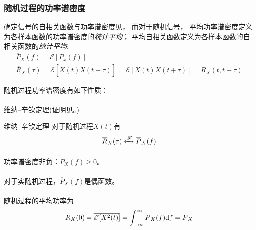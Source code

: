     \subsubsection{随机过程的功率谱密度}
    确定信号的自相关函数与功率谱密度见，
    而对于随机信号，
    平均功率谱密度定义为各样本函数的功率谱密度的\emph{统计平均}；
    平均自相关函数定义为各样本函数的自相关函数的\emph{统计平均}:
    \begin{align}
        \overline{P}_X(f)=\mathscr{E}[P_x(f)]\hspace{10em}\label{eq:avgPXf}\\
        \overline{R}_X(\tau)=\mathscr{E}[\overline{X(t)X(t+\tau)}]=\overline{\mathscr{E}[X(t)X(t+\tau)]}=\overline{R_X(t,t+\tau)}\label{eq:avgRXtau}
    \end{align}

    随机过程功率谱密度有如下性质：
    \vspace{-1ex}
    
    \paragraph{}{维纳--辛钦定理(证明见。)}
    \begin{mythm}{维纳--辛钦定理}\label{thm:Wiener_Khinchin}
        对于随机过程$X(t)$有
        \begin{equation}
            \overline{R}_X(\tau)\xleftrightarrow[]{\mathscr{F}}\overline{P}_X(f)
        \end{equation}
    \end{mythm}

    \paragraph{}功率谱密度非负：$\overline{P}_X(f)\geq 0$。

    \paragraph{}对于实随机过程，$\overline{P}_X(f)$是偶函数。

    \paragraph{}随机过程的平均功率为
    \begin{equation}
        \overline{R}_X(0)=\overline{\mathscr{E}[X^2(t)]}=\int_{-\infty}^{\infty}\overline{P}_X(f)\text{\upshape d} f=\overline{P}_X
    \end{equation}

